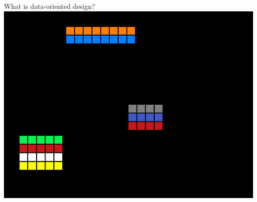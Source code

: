 \documentclass[10pt,xcolor=dvipsnames]{beamer}
\begin{document}
\begin{frame}{What is data-oriented design?}
  \centering\includegraphics[scale=0.75]{do-layout.png}
\end{frame}



\end{document}
